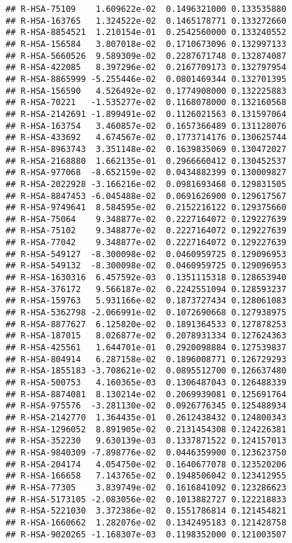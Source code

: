 \documentclass[
]{article}
\begin{document}
\begin{verbatim}
## R-HSA-75109    1.609622e-02  0.1496321000 0.133535880
## R-HSA-163765   1.324522e-02  0.1465178771 0.133272660
## R-HSA-8854521  1.210154e-01  0.2542560000 0.133240552
## R-HSA-156584   3.807018e-02  0.1710673096 0.132997133
## R-HSA-5660526  9.589309e-02  0.2287671748 0.132874087
## R-HSA-422085   8.397296e-02  0.2167709173 0.132797954
## R-HSA-8865999 -5.255446e-02  0.0801469344 0.132701395
## R-HSA-156590   4.526492e-02  0.1774908000 0.132225883
## R-HSA-70221   -1.535277e-02  0.1168078000 0.132160568
## R-HSA-2142691 -1.899491e-02  0.1126021563 0.131597064
## R-HSA-163754   3.460857e-02  0.1657366489 0.131128076
## R-HSA-433692   4.674567e-02  0.1773714176 0.130625744
## R-HSA-8963743  3.351148e-02  0.1639835069 0.130472027
## R-HSA-2168880  1.662135e-01  0.2966660412 0.130452537
## R-HSA-977068  -8.652159e-02  0.0434882399 0.130009827
## R-HSA-2022928 -3.166216e-02  0.0981693468 0.129831505
## R-HSA-8847453 -6.045488e-02  0.0691626900 0.129617567
## R-HSA-9749641  8.584595e-02  0.2152216122 0.129375660
## R-HSA-75064    9.348877e-02  0.2227164072 0.129227639
## R-HSA-75102    9.348877e-02  0.2227164072 0.129227639
## R-HSA-77042    9.348877e-02  0.2227164072 0.129227639
## R-HSA-549127  -8.300098e-02  0.0460959725 0.129096953
## R-HSA-549132  -8.300098e-02  0.0460959725 0.129096953
## R-HSA-1630316  6.457592e-03  0.1351115318 0.128653940
## R-HSA-376172   9.566187e-02  0.2242551094 0.128593237
## R-HSA-159763   5.931166e-02  0.1873727434 0.128061083
## R-HSA-5362798 -2.066991e-02  0.1072690668 0.127938975
## R-HSA-8877627  6.125820e-02  0.1891364533 0.127878253
## R-HSA-187015   8.026877e-02  0.2078931334 0.127624363
## R-HSA-425561   1.644701e-01  0.2920098884 0.127539837
## R-HSA-804914   6.287158e-02  0.1896008771 0.126729293
## R-HSA-1855183 -3.708621e-02  0.0895512700 0.126637480
## R-HSA-500753   4.160365e-03  0.1306487043 0.126488339
## R-HSA-8874081  8.130214e-02  0.2069939081 0.125691764
## R-HSA-975576  -3.281130e-02  0.0926776345 0.125488934
## R-HSA-2142770  1.364435e-01  0.2612438432 0.124800343
## R-HSA-1296052  8.891905e-02  0.2131454308 0.124226381
## R-HSA-352230   9.630139e-03  0.1337871522 0.124157013
## R-HSA-9840309 -7.898776e-02  0.0446359900 0.123623750
## R-HSA-204174   4.054750e-02  0.1640677078 0.123520206
## R-HSA-166658   7.143765e-02  0.1948506042 0.123412955
## R-HSA-77305    3.839749e-02  0.1616841092 0.123286623
## R-HSA-5173105 -2.083056e-02  0.1013882727 0.122218833
## R-HSA-5221030  3.372386e-02  0.1551786814 0.121454821
## R-HSA-1660662  1.282076e-02  0.1342495183 0.121428758
## R-HSA-9020265 -1.168307e-03  0.1198352000 0.121003507

\end{verbatim}
\end{document}
